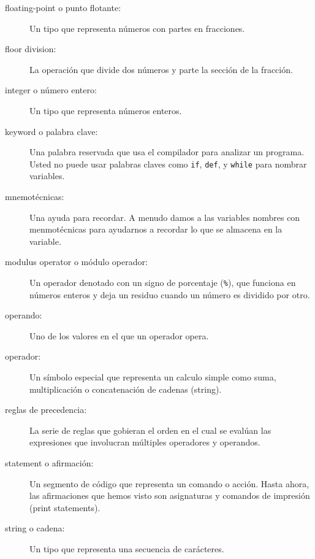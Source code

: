 \begin{ex}
\begin{description}
\begin{description}
\item[floating-point o punto flotante:] Un tipo que representa n\'umeros con partes en fracciones.

\item[floor division:] La operaci\'on que divide dos n\'umeros y parte la secci\'on de la fracci\'on.

\item[integer o n\'umero entero:] Un tipo que representa n\'umeros enteros.

\item[keyword o palabra clave:]  Una palabra reservada que usa el compilador para analizar un programa. Usted no puede usar palabras claves como {\tt if}, {\tt  def}, y {\tt while} para nombrar
variables.

\item[mnemot\'ecnicas:] Una ayuda para recordar. A menudo damos a las variables nombres con menmot\'ecnicas para ayudarnos a recordar lo que se almacena en la variable.

\item[modulus operator o m\'odulo operador:]  Un operador denotado con un signo de porcentaje
({\tt \%}), que funciona en n\'umeros enteros y deja un residuo cuando un n\'umero es dividido por otro.

\item[operando:]  Uno de los valores en el que un operador opera.

\item[operador:]  Un s\'imbolo especial que representa un calculo simple como suma, multiplicaci\'on o concatenaci\'on de cadenas (string).

\item[reglas de precedencia:]  La serie de reglas que gobieran el orden en el cual se eval\'uan las expresiones que involucran m\'ultiples operadores y operandos.

\item[statement o afirmaci\'on:]  Un segmento de c\'odigo que representa un comando o acci\'on. Hasta ahora, las afirmaciones que hemos visto son asignaturas y comandos de impresi\'on (print statements).

\item[string o cadena:] Un tipo que representa una secuencia de car\'acteres.


\end{description}
\end{description}
\end{ex}

